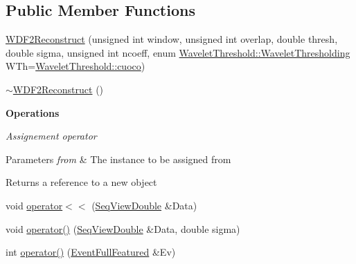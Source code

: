 \subsection*{Public Member Functions}
\begin{DoxyCompactItemize}
\item 
\hyperlink{classtsa_1_1_w_d_f2_reconstruct_adfa6c8b28248983673226fd3617b553d}{W\+D\+F2\+Reconstruct} (unsigned int window, unsigned int overlap, double thresh, double sigma, unsigned int ncoeff, enum \hyperlink{classtsa_1_1_wavelet_threshold_a50c42c95dae960986a985157ca038fae}{Wavelet\+Threshold\+::\+Wavelet\+Thresholding} W\+Th=\hyperlink{classtsa_1_1_wavelet_threshold_a50c42c95dae960986a985157ca038faea849b2c33799f9de0e842f1d935ea3822}{Wavelet\+Threshold\+::cuoco})
\item 
\hyperlink{classtsa_1_1_w_d_f2_reconstruct_a0f5a941f09423254ceaff5d60365d894}{$\sim$\+W\+D\+F2\+Reconstruct} ()
\end{DoxyCompactItemize}
\begin{Indent}\textbf{ Operations}\par
{\em Assignement operator


\begin{DoxyParams}{Parameters}
{\em from} & The instance to be assigned from\\
\hline
\end{DoxyParams}
\begin{DoxyReturn}{Returns}
a reference to a new object 
\end{DoxyReturn}
}\begin{DoxyCompactItemize}
\item 
void \hyperlink{classtsa_1_1_w_d_f2_reconstruct_aa3a0ac97f9c8726c62c7d4fe01cbb6d4}{operator$<$$<$} (\hyperlink{namespacetsa_ac599574bcc094eda25613724b8f3ca9e}{Seq\+View\+Double} \&Data)
\item 
void \hyperlink{classtsa_1_1_w_d_f2_reconstruct_a12d9951eb4b96133f850d060bf49db50}{operator()} (\hyperlink{namespacetsa_ac599574bcc094eda25613724b8f3ca9e}{Seq\+View\+Double} \&Data, double sigma)
\item 
int \hyperlink{classtsa_1_1_w_d_f2_reconstruct_a525306bf051c7a0da953aa8c887abf86}{operator()} (\hyperlink{classtsa_1_1_event_full_featured}{Event\+Full\+Featured} \&Ev)
\end{DoxyCompactItemize}
\end{Indent}
